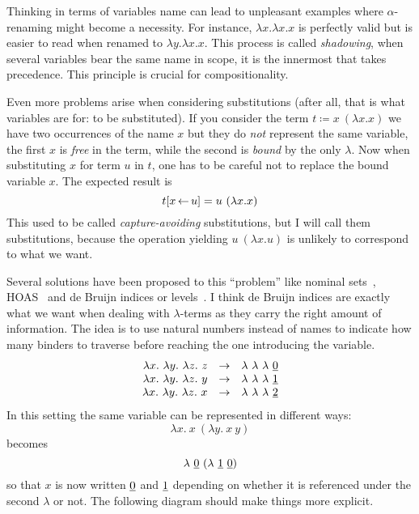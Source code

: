Thinking in terms of variables name can lead to unpleasant examples where
\(\alpha\)-renaming might become a necessity.
For instance, \(\lambda x. \lambda x. x\) is perfectly valid but is easier to
read when renamed to \(\lambda y. \lambda x. x\). This process is called
\emph{shadowing}, when several variables bear the same name in scope, it is the
innermost that takes precedence. This principle is crucial for compositionality.

Even more problems arise when considering substitutions (after all, that is what
variables are for: to be substituted).
If you consider the term \(t \coloneqq x\ (\lambda x. x)\) we have two
occurrences of the name \(x\) but they do \emph{not} represent the same
variable, the first \(x\) is \emph{free} in the term, while the second is
\emph{bound} by the only \(\lambda\).
Now when substituting \(x\) for term \(u\) in \(t\), one has to be careful not
to replace the bound variable \(x\). The expected result is
\[
  t[x \sto u] = u\ (\lambda x. x)
\]
This used to be called \emph{capture-avoiding} substitutions, but I will call
them substitutions, because the operation yielding \(u\ (\lambda x. u)\)
is unlikely to correspond to what we want.

Several solutions have been proposed to this ``problem'' like nominal
sets~,
\acrfull{HOAS}~ and de Bruijn indices or
levels~.
I think de Bruijn indices are exactly what we want when dealing with
\(\lambda\)-terms as they carry the right amount of information.
The idea is to use natural numbers instead of names to indicate how many binders
to traverse before reaching the one introducing the variable.
\[
  \begin{array}{rcl}
    \lambda x.\ \lambda y.\ \lambda z.\ z
    &\to& \lambda\ \lambda\ \lambda\ \underline{0} \\
    \lambda x.\ \lambda y.\ \lambda z.\ y
    &\to& \lambda\ \lambda\ \lambda\ \underline{1} \\
    \lambda x.\ \lambda y.\ \lambda z.\ x
    &\to& \lambda\ \lambda\ \lambda\ \underline{2}
  \end{array}
\]
In this setting the same variable can be represented in different ways:
\[
  \lambda x.\ x\ (\lambda y.\ x\ y)
\]
becomes
\[
  \lambda\ \db{0}\ (\lambda\ \db{1}\ \db{0})
\]
so that \(x\) is now written \(\underline{0}\) and \(\underline{1}\) depending on whether it
is referenced under the second \(\lambda\) or not.
The following diagram should make things more explicit.

